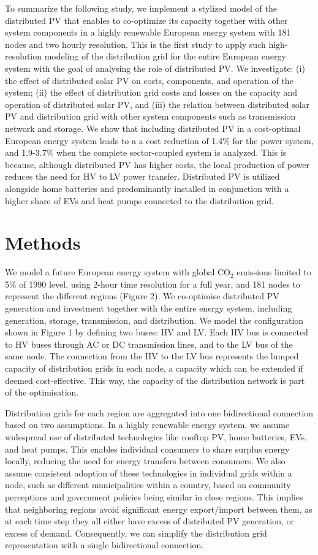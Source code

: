 \documentclass[review]{elsarticle}
\begin{document}
	To summarize the following study, we implement a stylized model of the distributed PV that enables to co-optimize its capacity together with other system components in a highly renewable European energy system with 181 nodes and two hourly resolution. This is the first study to apply such high-resolution modeling of the distribution grid for the entire European energy system with the goal of analysing the role of distributed PV. We investigate: (i) the effect of distributed solar PV on costs, components, and operation of the system; (ii) the effect of distribution grid costs and losses on the capacity and operation of distributed solar PV, and (iii) the relation between distributed solar PV and distribution grid with other system components such as transmission network and storage. We show that including distributed PV in a cost-optimal European energy system leads to a a cost reduction of 1.4\% for the power system, and 1.9-3.7\% when the complete sector-coupled system is analyzed. This is because, although distributed PV has higher costs, the local production of power reduces the need for HV to LV power transfer. Distributed PV is utilized alongside home batteries and predominantly installed in conjunction with a  higher share of EVs and heat pumps connected to the distribution grid.
	
	
	\section{Methods}
	
	We model a future European energy system with global $\mathrm{CO_2}$ emissions limited to 5\% of 1990 level, using 2-hour time resolution for a full year, and 181 nodes to represent the different regions (Figure 2). We co-optimise distributed PV generation and investment together with the entire energy system, including generation, storage, transmission, and distribution. We model the configuration shown in Figure 1 by defining two buses: HV and LV. Each HV bus is connected to HV buses through AC or DC transmission lines, and to the LV bus of the same node. The connection from the HV to the LV bus represents the lumped capacity of distribution grids in each node, a capacity which can be extended if deemed cost-effective. This way, the capacity of the distribution network is part of the optimisation.
	
	Distribution grids for each region are aggregated into one bidirectional connection based on two assumptions. In a highly renewable energy system, we assume widespread use of distributed technologies like rooftop PV, home batteries, EVs, and heat pumps. This enables individual consumers to share surplus energy locally, reducing the need for energy transfers between consumers. We also assume consistent adoption of these technologies in individual grids within a node, such as different municipalities within a country, based on community perceptions and government policies being similar in close regions. This implies that neighboring regions avoid significant energy export/import between them, as at each time step they all either have excess of distributed PV generation, or excess of demand. Consequently, we can simplify the distribution grid representation with a single bidirectional connection.
	
\end{document}
